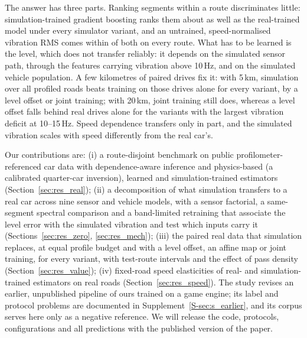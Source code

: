 The answer has three parts.
Ranking segments within a route discriminates little: simulation-trained gradient boosting ranks them about as well as the real-trained model under every simulator variant, and an untrained, speed-normalised vibration RMS comes within \rpAbsMax{} of both on every route.
What has to be learned is the level, which does not transfer reliably: it depends on the simulated sensor path, through the features carrying vibration above 10\,Hz, and on the simulated vehicle population.
A few kilometres of paired drives fix it: with 5\,km, simulation over all profiled roads beats training on those drives alone for every variant, by a level offset or joint training; with 20\,km, joint training still does, whereas a level offset falls behind real drives alone for the variants with the largest vibration deficit at 10--15\,Hz.
Speed dependence transfers only in part, and the simulated vibration scales with speed differently from the real car's.

Our contributions are:
(i) a route-disjoint benchmark on public profilometer-referenced car data with dependence-aware inference and physics-based (a calibrated quarter-car inversion), learned and simulation-trained estimators (Section~\ref{sec:res_real});
(ii) a decomposition of what simulation transfers to a real car across nine sensor and vehicle models, with a sensor factorial, a same-segment spectral comparison and a band-limited retraining that associate the level error with the simulated vibration and test which inputs carry it (Sections~\ref{sec:res_zero}, \ref{sec:res_mech});
(iii) the paired real data that simulation replaces, at equal profile budget and with a level offset, an affine map or joint training, for every variant, with test-route intervals and the effect of pass density (Section~\ref{sec:res_value});
(iv) fixed-road speed elasticities of real- and simulation-trained estimators on real roads (Section~\ref{sec:res_speed}).
The study revises an earlier, unpublished pipeline of ours trained on a game engine; its label and protocol problems are documented in Supplement~\ref{S-sec:s_earlier}, and its corpus serves here only as a negative reference.
We will release the code, protocols, configurations and all predictions with the published version of the paper.
